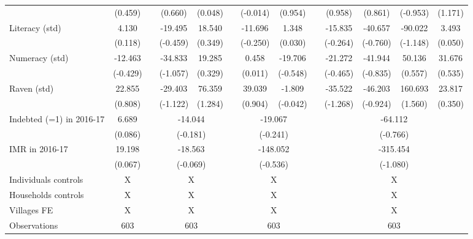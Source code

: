 \begin{table}[htbp]
{\begin{tabular}{lcccccccccccc}
          & (0.459) &       & (0.660) & (0.048) &       & (-0.014) & (0.954) &       & (0.958) & (0.861) & (-0.953) & (1.171) \\
    Literacy (std) & 4.130 &       & -19.495 & 18.540 &       & -11.696 & 1.348 &       & -15.835 & -40.657 & -90.022 & 3.493 \\
          & (0.118) &       & (-0.459) & (0.349) &       & (-0.250) & (0.030) &       & (-0.264) & (-0.760) & (-1.148) & (0.050) \\
    Numeracy (std) & -12.463 &       & -34.833 & 19.285 &       & 0.458 & -19.706 &       & -21.272 & -41.944 & 50.136 & 31.676 \\
          & (-0.429) &       & (-1.057) & (0.329) &       & (0.011) & (-0.548) &       & (-0.465) & (-0.835) & (0.557) & (0.535) \\
    Raven (std) & 22.855 &       & -29.403 & 76.359 &       & 39.039 & -1.809 &       & -35.522 & -46.203 & 160.693 & 23.817 \\
          & (0.808) &       & (-1.122) & (1.284) &       & (0.904) & (-0.042) &       & (-1.268) & (-0.924) & (1.560) & (0.350) \\
\cmidrule{1-2}\cmidrule{4-5}\cmidrule{7-8}\cmidrule{10-13}    Indebted (=1) in 2016-17 & 6.689 &       & \multicolumn{2}{c}{-14.044} &       & \multicolumn{2}{c}{-19.067} &       & \multicolumn{4}{c}{-64.112} \\
          & (0.086) &       & \multicolumn{2}{c}{(-0.181)} &       & \multicolumn{2}{c}{(-0.241)} &       & \multicolumn{4}{c}{(-0.766)} \\
    IMR in 2016-17 & 19.198 &       & \multicolumn{2}{c}{-18.563} &       & \multicolumn{2}{c}{-148.052} &       & \multicolumn{4}{c}{-315.454} \\
          & (0.067) &       & \multicolumn{2}{c}{(-0.069)} &       & \multicolumn{2}{c}{(-0.536)} &       & \multicolumn{4}{c}{(-1.080)} \\
    Individuals controls & X     &       & \multicolumn{2}{c}{X} &       & \multicolumn{2}{c}{X} &       & \multicolumn{4}{c}{X} \\
    Households controls & X     &       & \multicolumn{2}{c}{X} &       & \multicolumn{2}{c}{X} &       & \multicolumn{4}{c}{X} \\
    Villages FE & X     &       & \multicolumn{2}{c}{X} &       & \multicolumn{2}{c}{X} &       & \multicolumn{4}{c}{X} \\
    \midrule
    Observations & 603   &       & \multicolumn{2}{c}{603} &       & \multicolumn{2}{c}{603} &       & \multicolumn{4}{c}{603} \\

\end{tabular}}
\end{table}
